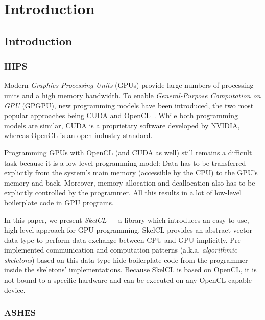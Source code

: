 
\chapter{Introduction} %

\label{ch:introduction} %

\section{Introduction}

\subsection{HIPS}
Modern \emph{Graphics Processing Units} (GPUs) provide large numbers of processing units and a high memory bandwidth.
To enable \emph{General-Purpose Computation on GPU} (GPGPU), new programming models have been introduced, the two most popular approaches being CUDA and OpenCL~\cite{KirkHw2010,OpenCL}.
While both programming models are similar, CUDA is a proprietary software developed by NVIDIA, whereas OpenCL is an open industry standard.

Programming GPUs with OpenCL (and CUDA as well) still remains a difficult task because it is a low-level programming model:
Data has to be transferred explicitly from the system's main memory (accessible by the CPU) to the GPU's memory and back.
Moreover, memory allocation and deallocation also has to be explicitly controlled by the programmer.
All this results in a lot of low-level boilerplate code in GPU programs.

In this paper, we present \emph{SkelCL} --- a library which introduces an easy-to-use, high-level approach for GPU programming.
SkelCL provides an abstract vector data type to perform data exchange between CPU and GPU implicitly.
Pre-implemented communication and computation patterns (a.k.a. \emph{algorithmic skeletons}) based on this data type hide boilerplate code from the programmer inside the skeletons' implementations.
Because SkelCL is based on OpenCL, it is not bound to a specific hardware and can be executed on any OpenCL-capable device.

\subsection{ASHES}

